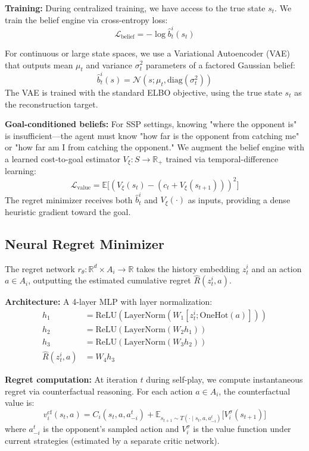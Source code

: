 \documentclass{article}
\begin{document}
\textbf{Training:} During centralized training, we have access to the true state $s_t$. We train the belief engine via cross-entropy loss:
\begin{equation}
\mathcal{L}_{\text{belief}} = -\log \hat{b}_t^i(s_t)
\end{equation}

For continuous or large state spaces, we use a Variational Autoencoder (VAE) that outputs mean $\mu_t$ and variance $\sigma_t^2$ parameters of a factored Gaussian belief:
\begin{equation}
\hat{b}_t^i(s) = \mathcal{N}(s; \mu_t, \text{diag}(\sigma_t^2))
\end{equation}
The VAE is trained with the standard ELBO objective, using the true state $s_t$ as the reconstruction target.

\textbf{Goal-conditioned beliefs:} For SSP settings, knowing "where the opponent is" is insufficient—the agent must know "how far is the opponent from catching me" or "how far am I from catching the opponent." We augment the belief engine with a learned cost-to-goal estimator $V_\xi: S \to \mathbb{R}_+$ trained via temporal-difference learning:
\begin{equation}
\mathcal{L}_{\text{value}} = \mathbb{E}\big[(V_\xi(s_t) - (c_t + V_\xi(s_{t+1})))^2\big]
\end{equation}
The regret minimizer receives both $\hat{b}_t^i$ and $V_\xi(\cdot)$ as inputs, providing a dense heuristic gradient toward the goal.

\subsection{Neural Regret Minimizer}

The regret network $r_\theta: \mathbb{R}^d \times A_i \to \mathbb{R}$ takes the history embedding $z_t^i$ and an action $a \in A_i$, outputting the estimated cumulative regret $\hat{R}(z_t^i, a)$.

\textbf{Architecture:} A 4-layer MLP with layer normalization:
\begin{align}
h_1 &= \text{ReLU}(\text{LayerNorm}(W_1 [z_t^i; \text{OneHot}(a)])) \\
h_2 &= \text{ReLU}(\text{LayerNorm}(W_2 h_1)) \\
h_3 &= \text{ReLU}(\text{LayerNorm}(W_3 h_2)) \\
\hat{R}(z_t^i, a) &= W_4 h_3
\end{align}

\textbf{Regret computation:} At iteration $t$ during self-play, we compute instantaneous regret via counterfactual reasoning. For each action $a \in A_i$, the counterfactual value is:
\begin{equation}
v^{\text{cf}}_i(s_t, a) = C_i(s_t, a, a_{-i}^t) + \mathbb{E}_{s_{t+1} \sim T(\cdot \mid s_t, a, a_{-i}^t)} \big[V_i^{\sigma}(s_{t+1})\big]
\end{equation}
where $a_{-i}^t$ is the opponent's sampled action and $V_i^\sigma$ is the value function under current strategies (estimated by a separate critic network).
\end{document}
